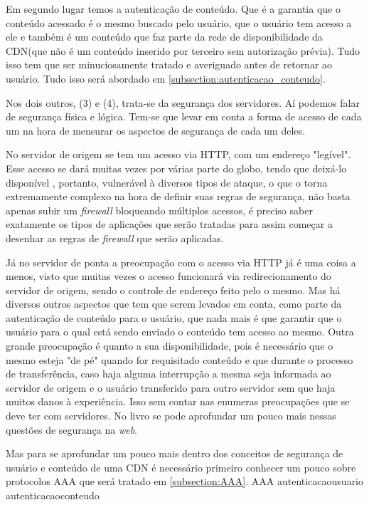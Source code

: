 Em segundo lugar temos a autentica\c{c}\~ao de conte\'udo. Que \'e a garantia que o conte\'udo acessado \'e o mesmo buscado pelo usu\'ario, que o usu\'ario tem acesso a ele e tamb\'em \'e um conte\'udo que faz parte da rede de disponibilidade da CDN(que n\~ao \'e um conte\'udo inserido por terceiro sem autoriza\c{c}\~ao pr\'evia). Tudo isso tem que ser minuciosamente tratado e averiguado antes de retornar ao usu\'ario. Tudo isso ser\'a abordado em \ref{subsection:autenticacao_conteudo}.

Nos dois outros, (3) e (4), trata-se da seguran\c{c}a dos servidores. A\'i podemos falar de seguran\c{c}a f\'isica e l\'ogica. Tem-se que levar em conta a forma de acesso de cada um na hora de mensurar os aspectos de seguran\c{c}a de cada um deles. 

No servidor de origem se tem um acesso via HTTP, com um endereço "leg\'ivel". Esse acesso se dar\'a muitas vezes por v\'arias parte do globo, tendo que deix\'a-lo dispon\'ivel , portanto, vulner\'avel \`a diversos tipos de ataque, o que o torna extremamente complexo na hora de definir suas regras de seguran\c{c}a, n\~ao basta apenas subir um \textit{firewall} bloqueando m\'ultiplos acessos, \'e preciso saber exatamente os tipos de aplica\c{c}\~oes que ser\~ao tratadas para assim come\c{c}ar a desenhar as regras de \textit{firewall} que ser\~ao aplicadas.

J\'a no servidor de ponta a preocupa\c{c}\~ao com o acesso via HTTP j\'a \'e uma coisa a menos, visto que muitas vezes o acesso funcionar\'a via redirecionamento do servidor de origem, sendo o controle de endere\c{c}o feito pelo o mesmo. Mas h\'a diversos outros aspectos que tem que serem levados em conta, como parte da autentica\c{c}\~ao de conte\'udo para o usu\'ario, que nada mais \'e que garantir que o usu\'ario para o qual est\'a sendo enviado o conte\'udo tem acesso ao mesmo. Outra grande preocupa\c{c}\~ao \'e quanto a sua disponibilidade, pois \'e necess\'ario que o mesmo esteja "de p\'e" quando for requisitado conte\'udo e que durante o processo de transfer\^encia, caso haja alguma interrup\c{c}\~ao a mesma seja informada ao servidor de origem e o usu\'ario transferido para outro servidor sem que haja muitos danos \`a experi\^encia. Isso sem contar nas enumeras preocupa\c{c}\~oes que se deve ter com servidores. No livro \cite{stallings1995network} se pode aprofundar um pouco mais nessas quest\~oes de seguran\c{c}a na \textit{web}.

Mas para se aprofundar um pouco mais dentro dos conceitos de seguran\c{c}a de usu\'ario e conte\'udo de uma CDN \'e necess\'ario primeiro conhecer um pouco sobre protocolos AAA que ser\'a tratado em \ref{subsection:AAA}.
{AAA}
{autenticacaousuario}
{autenticacaoconteudo}